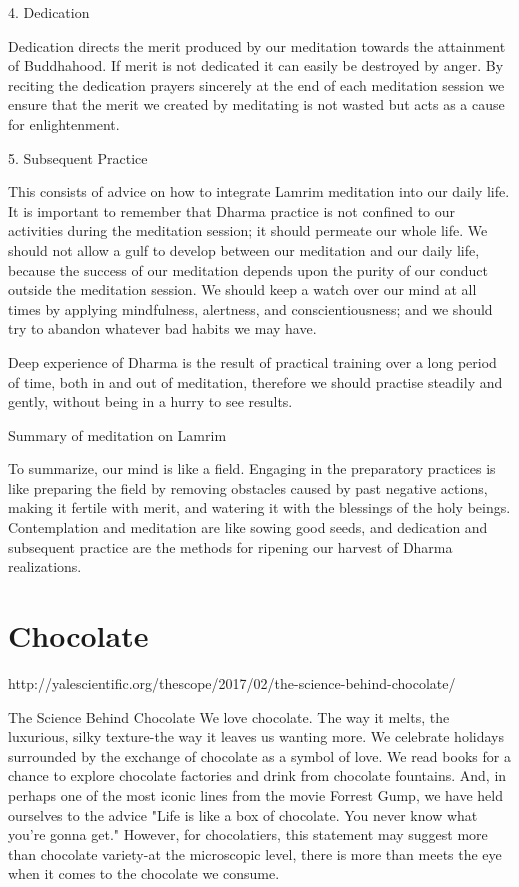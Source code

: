 \documentclass{book}\usepackage[]{graphicx}\usepackage[]{color}
\begin{document}
4. Dedication

Dedication directs the merit produced by our meditation towards the attainment of Buddhahood. If merit is not dedicated it can easily be destroyed by anger. By reciting the dedication prayers sincerely at the end of each meditation session we ensure that the merit we created by meditating is not wasted but acts as a cause for enlightenment.

5. Subsequent Practice

This consists of advice on how to integrate Lamrim meditation into our daily life. It is important to remember that Dharma practice is not confined to our activities during the meditation session; it should permeate our whole life. We should not allow a gulf to develop between our meditation and our daily life, because the success of our meditation depends upon the purity of our conduct outside the meditation session. We should keep a watch over our mind at all times by applying mindfulness, alertness, and conscientiousness; and we should try to abandon whatever bad habits we may have.

Deep experience of Dharma is the result of practical training over a long period of time, both in and out of meditation, therefore we should practise steadily and gently, without being in a hurry to see results.

Summary of meditation on Lamrim

To summarize, our mind is like a field. Engaging in the preparatory practices is like preparing the field by removing obstacles caused by past negative actions, making it fertile with merit, and watering it with the blessings of the holy beings. Contemplation and meditation are like sowing good seeds, and dedication and subsequent practice are the methods for ripening our harvest of Dharma realizations.


\chapter{Chocolate}

http://yalescientific.org/thescope/2017/02/the-science-behind-chocolate/

The Science Behind Chocolate
We love chocolate. The way it melts, the luxurious, silky texture-the way it leaves us wanting more. We celebrate holidays surrounded by the exchange of chocolate as a symbol of love. We read books for a chance to explore chocolate factories and drink from chocolate fountains. And, in perhaps one of the most iconic lines from the movie Forrest Gump, we have held ourselves to the advice "Life is like a box of chocolate. You never know what you're gonna get." However, for chocolatiers, this statement may suggest more than chocolate variety-at the microscopic level, there is more than meets the eye when it comes to the chocolate we consume.
\end{document}
